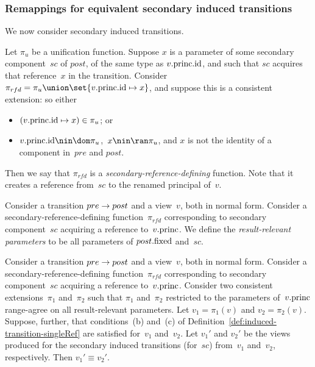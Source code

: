 

\subsubsection{Remappings for equivalent secondary induced transitions}
\label{sec:secondary-result-defining}

We now consider secondary induced transitions. 
% 
\begin{definition}
Let $\pi_u$ be a unification function.  Suppose $x$ is a parameter of some
secondary component~$sc$ of $post$,  of the same type as
$v.\mathrm{princ}.\mathrm{id}$, and such that $sc$ acquires that reference~$x$ in the
transition.  Consider $\pi_{rfd} = \pi_u \union \set{v.\princ.\id \mapsto x}$, and
suppose this is a consistent extension: so either
\begin{itemize}
\item $(v.\mathrm{princ}.\mathrm{id} \mapsto x) \in \pi_u$; or
\item $v.\princ.\id \nin \dom \pi_u$,\, $x \nin \ran \pi_u$, and $x$ is not
  the identity of a component in~$pre$ and $post$.
\end{itemize}
%
Then we say that $\pi_{rfd}$ is a \emph{secondary-reference-defining}
function.  Note that it creates a reference from~$sc$ to the renamed principal
of~$v$.
\end{definition}


\begin{definition}
Consider a transition $pre \stackrel{}\rightarrow post$ and a view~$v$, both in normal form.
Consider a secondary-reference-defining function~$\pi_{rfd}$ corresponding to
secondary component~$sc$ acquiring a reference to~$v.\mathrm{princ}$.  We define the
\emph{result-relevant parameters} to be all parameters of $post.\mathrm{fixed}$
and~$sc$.
\end{definition}


\begin{lemma}
\label{lem:singleRef:remappings-equivalent-secondary}
Consider a transition $pre \stackrel{}\rightarrow post$ and a view~$v$, both in normal form.
Consider a secondary-reference-defining function~$\pi_{rfd}$ corresponding to
secondary component~$sc$ acquiring a reference to~$v.\mathrm{princ}$.  Consider two
consistent extensions~$\pi_1$ and~$\pi_2$ such that $\pi_1$ and~$\pi_2$
restricted to the parameters of~$v.\mathrm{princ}$ range-agree on all result-relevant
parameters.  
Let $v_1 = \pi_1(v)$ and $v_2 =
\pi_2(v)$. 
%
Suppose, further, that conditions~(b) and~(c) of
Definition~\ref{def:induced-transition-singleRef} are satisfied for~$v_1$
and~$v_2$.  Let $v_1'$ and $v_2'$ be the views produced for the secondary
induced transitions (for~$sc$) from~$v_1$ and~$v_2$, respectively.  Then $v_1'
\equiv v_2'$.
\end{lemma}

